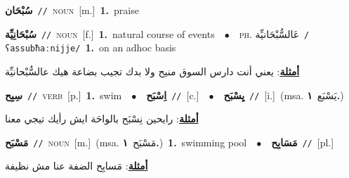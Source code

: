 \documentclass[10pt,a4paper,twoside]{article} %
\begin{document}
\begin{multicols}{2}
{\setlength\topsep{0pt}\textbf{\foreignlanguage{arabic}{سُبْحَان}}\ {\color{gray}\texttt{//}\color{black}}\ \textsc{noun}\ [m.]\ \textbf{1.}~praise\ } \vspace{2mm}

{\setlength\topsep{0pt}\textbf{\foreignlanguage{arabic}{سُبْحَانِيِّة}}\ {\color{gray}\texttt{//}\color{black}}\ \textsc{noun}\ [f.]\ \textbf{1.}~natural course of events\ \ $\bullet$\ \ \textsc{ph.} \color{gray} \foreignlanguage{arabic}{عَالسُّبْحَانيِّة}\color{black}\ {\color{gray}\texttt{/{\sffamily ʕassubħaːnijje}/}\color{black}}\ \textbf{1.}~on an adhoc basis\  \begin{flushright}\color{gray}\foreignlanguage{arabic}{\textbf{\underline{\foreignlanguage{arabic}{أمثلة}}}: يعني أنت دارس السوق منيح ولا بدك تجيب بضاعة هيك عالسُّبْحانيِّة}\end{flushright}\color{black}} \vspace{2mm}

{\setlength\topsep{0pt}\textbf{\foreignlanguage{arabic}{سِبِح}}\ {\color{gray}\texttt{//}\color{black}}\ \textsc{verb}\ [p.]\ \textbf{1.}~swim\ \ $\bullet$\ \ \setlength\topsep{0pt}\textbf{\foreignlanguage{arabic}{اِسْبَح}}\ {\color{gray}\texttt{//}\color{black}}\ [c.]\ \ $\bullet$\ \ \setlength\topsep{0pt}\textbf{\foreignlanguage{arabic}{يِسْبَح}}\ {\color{gray}\texttt{//}\color{black}}\ [i.]\ \color{gray}(msa. \foreignlanguage{arabic}{يَسْبَع}~\foreignlanguage{arabic}{\textbf{١.}})\color{black}\  \begin{flushright}\color{gray}\foreignlanguage{arabic}{\textbf{\underline{\foreignlanguage{arabic}{أمثلة}}}: رايحين نِسْبَح بالواحَة ايش رأيك تيجي معنا}\end{flushright}\color{black}} \vspace{2mm}

{\setlength\topsep{0pt}\textbf{\foreignlanguage{arabic}{مَسْبَح}}\ {\color{gray}\texttt{//}\color{black}}\ \textsc{noun}\ [m.]\ \color{gray}(msa. \foreignlanguage{arabic}{مَسْبَح}~\foreignlanguage{arabic}{\textbf{١.}})\color{black}\ \textbf{1.}~swimming pool\ \ $\bullet$\ \ \setlength\topsep{0pt}\textbf{\foreignlanguage{arabic}{مَسَابِح}}\ {\color{gray}\texttt{//}\color{black}}\ [pl.]\  \begin{flushright}\color{gray}\foreignlanguage{arabic}{\textbf{\underline{\foreignlanguage{arabic}{أمثلة}}}: مَسابِح الضفة عنا مش نظيفة}\end{flushright}\color{black}} \vspace{2mm}


\end{multicols}
\end{document}
